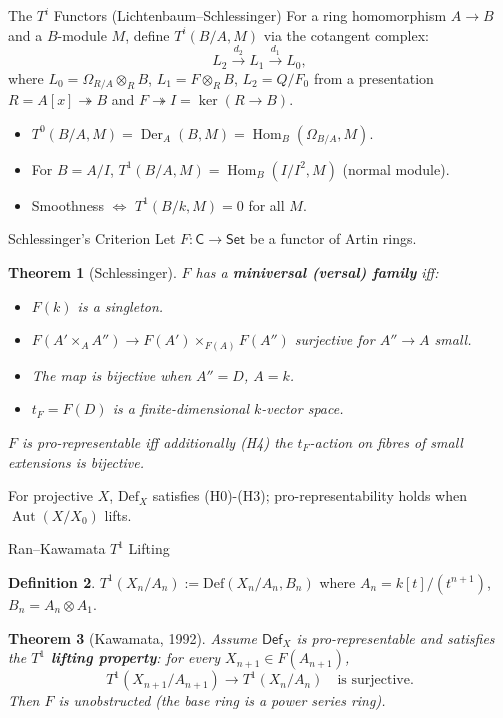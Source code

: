 \documentclass{beamer}
\theoremstyle{definition}
\newtheorem{defn}{Definition}
\theoremstyle{plain}
\newtheorem{thm}[defn]{Theorem}
\begin{document}
\begin{frame}{The $T^i$ Functors (Lichtenbaum–Schlessinger)}
    For a ring homomorphism $A\to B$ and a $B$-module $M$, define $T^i(B/A,M)$ via the cotangent complex:
    \[
    L_2 \xrightarrow{d_2} L_1 \xrightarrow{d_1} L_0,
    \]
    where $L_0 = \Omega_{R/A}\otimes_R B$, $L_1 = F\otimes_R B$, $L_2 = Q/F_0$ from a presentation $R=A[x]\twoheadrightarrow B$ and $F\twoheadrightarrow I=\ker(R\to B)$.
    \pause
    \begin{itemize}
        \item $T^0(B/A,M) = \operatorname{Der}_A(B,M) = \operatorname{Hom}_B(\Omega_{B/A},M)$.
        \item For $B=A/I$, $T^1(B/A,M)=\operatorname{Hom}_B(I/I^2,M)$ (normal module).
        \item Smoothness $\iff$ $T^1(B/k,M)=0$ for all $M$.
    \end{itemize}
\end{frame}

\begin{frame}{Schlessinger's Criterion}
    Let $F:\mathsf{C}\to\mathsf{Set}$ be a functor of Artin rings.
    \begin{thm}[Schlessinger]
        $F$ has a \textbf{miniversal (versal) family} iff:
        \begin{itemize}
            \item[(H0)] $F(k)$ is a singleton.
            \item[(H1)] $F(A'\times_A A'') \to F(A')\times_{F(A)}F(A'')$ surjective for $A''\to A$ small.
            \item[(H2)] The map is bijective when $A''=D$, $A=k$.
            \item[(H3)] $t_F = F(D)$ is a finite-dimensional $k$-vector space.
        \end{itemize}
        $F$ is pro-representable iff additionally (H4) the $t_F$-action on fibres of small extensions is bijective.
    \end{thm}
    \pause
    For projective $X$, $\text{Def}_X$ satisfies (H0)-(H3); pro-representability holds when $\operatorname{Aut}(X/X_0)$ lifts.
\end{frame}

\begin{frame}{Ran–Kawamata $T^1$ Lifting}
    \begin{defn}
        $T^1(X_n/A_n) := \text{Def}(X_n/A_n, B_n)$ where $A_n=k[t]/(t^{n+1})$, $B_n = A_n\otimes A_1$.
    \end{defn}
    \begin{thm}[Kawamata, 1992]
        Assume $\mathsf{Def}_X$ is pro-representable and satisfies the \textbf{$T^1$ lifting property}: for every $X_{n+1}\in F(A_{n+1})$,
        \[
        T^1(X_{n+1}/A_{n+1}) \to T^1(X_n/A_n) \quad\text{is surjective}.
        \]
        Then $F$ is unobstructed (the base ring is a power series ring).
    \end{thm}
\end{frame}
\end{document}
